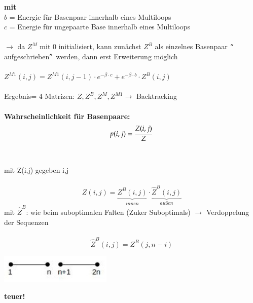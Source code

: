 \textbf{mit}\\
$b$ = Energie für Basenpaar innerhalb eines Multiloops\\
$c$ = Energie für ungepaarte Base innerhalb eines Multiloops
\\\\
$\rightarrow$ da $Z^M$ mit 0 initialisiert, kann zunächst $Z^B$ als einzelnes Basenpaar $"$aufgeschrieben$"$ werden, dann erst Erweiterung möglich
\\\\
$Z^{M1}(i,j) = Z^{M1}(i, j-1) \cdot e^{-\beta \cdot c} + e^{-\beta \cdot b} \cdot Z^B(i,j) $
\\\\
Ergebnis= 4 Matrizen: $Z, Z^B, Z^M, Z^{M1} \rightarrow$ Backtracking
\\\\
\textbf{Wahrscheinlichkeit für Basenpaare:}
\begin{equation}
p(i,j)={Z(i,j) \over Z}
\end{equation}
\\\\
mit Z(i,j) gegeben i,j
\\\\
\begin{equation}
Z(i,j)=\underbrace{Z^B(i,j)}_{innen} \cdot \underbrace{\widehat{Z}^B(i,j)}_{außen}
\end{equation}
mit $\widehat{Z}^B$: wie beim suboptimalen Falten (Zuker Suboptimals) $\rightarrow$ Verdoppelung der Sequenzen
\\\\
\begin{equation}
\widehat{Z}^B(i,j)= Z^B(j,n-i)
\end{equation}
\begin{center}
\includegraphics[width=0.4\textwidth]{lectures/160425/pix/1.jpg}
\end{center}
\textbf{teuer!}

\newpage


